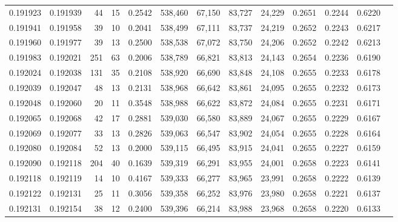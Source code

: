 \begin{tabular}{rrrrrrrrrrrrr}
0.191923 & 0.191939 &    44 &  15 &                                     0.2542 & 538,460 &  67,150 &  83,727 &  24,229 & 0.2651 & 0.2244 & 0.6220 \\
0.191941 & 0.191958 &    39 &  10 &                                     0.2041 & 538,499 &  67,111 &  83,737 &  24,219 & 0.2652 & 0.2243 & 0.6217 \\
0.191960 & 0.191977 &    39 &  13 &                                     0.2500 & 538,538 &  67,072 &  83,750 &  24,206 & 0.2652 & 0.2242 & 0.6213 \\
0.191983 & 0.192021 &   251 &  63 &                                     0.2006 & 538,789 &  66,821 &  83,813 &  24,143 & 0.2654 & 0.2236 & 0.6190 \\
0.192024 & 0.192038 &   131 &  35 &                                     0.2108 & 538,920 &  66,690 &  83,848 &  24,108 & 0.2655 & 0.2233 & 0.6178 \\
0.192039 & 0.192047 &    48 &  13 &                                     0.2131 & 538,968 &  66,642 &  83,861 &  24,095 & 0.2655 & 0.2232 & 0.6173 \\
0.192048 & 0.192060 &    20 &  11 &                                     0.3548 & 538,988 &  66,622 &  83,872 &  24,084 & 0.2655 & 0.2231 & 0.6171 \\
0.192065 & 0.192068 &    42 &  17 &                                     0.2881 & 539,030 &  66,580 &  83,889 &  24,067 & 0.2655 & 0.2229 & 0.6167 \\
0.192069 & 0.192077 &    33 &  13 &                                     0.2826 & 539,063 &  66,547 &  83,902 &  24,054 & 0.2655 & 0.2228 & 0.6164 \\
0.192080 & 0.192084 &    52 &  13 &                                     0.2000 & 539,115 &  66,495 &  83,915 &  24,041 & 0.2655 & 0.2227 & 0.6159 \\
0.192090 & 0.192118 &   204 &  40 &                                     0.1639 & 539,319 &  66,291 &  83,955 &  24,001 & 0.2658 & 0.2223 & 0.6141 \\
0.192118 & 0.192119 &    14 &  10 &                                     0.4167 & 539,333 &  66,277 &  83,965 &  23,991 & 0.2658 & 0.2222 & 0.6139 \\
0.192122 & 0.192131 &    25 &  11 &                                     0.3056 & 539,358 &  66,252 &  83,976 &  23,980 & 0.2658 & 0.2221 & 0.6137 \\
0.192131 & 0.192154 &    38 &  12 &                                     0.2400 & 539,396 &  66,214 &  83,988 &  23,968 & 0.2658 & 0.2220 & 0.6133 \\

\end{tabular}
